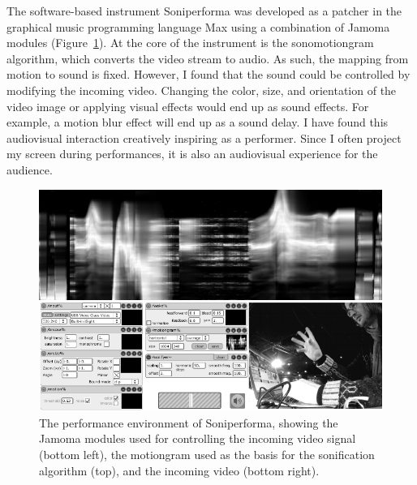 The software-based instrument Soniperforma was developed as a patcher in the graphical music programming language Max using a combination of Jamoma modules (Figure~\ref{fig:figures_soniperforma_soniperforma}). At the core of the instrument is the sonomotiongram algorithm, which converts the video stream to audio. As such, the mapping from motion to sound is fixed. However, I found that the sound could be controlled by modifying the incoming video. Changing the color, size, and orientation of the video image or applying visual effects would end up as sound effects. For example, a motion blur effect will end up as a sound delay. I have found this audiovisual interaction creatively inspiring as a performer. Since I often project my screen during performances, it is also an audiovisual experience for the audience.

\begin{figure}[tbp]
		\includegraphics[width=1\textwidth]{figures/72-soniperforma-crop.pdf}
	\caption{The performance environment of Soniperforma, showing the Jamoma modules used for controlling the incoming video signal (bottom left), the motiongram used as the basis for the sonification algorithm (top), and the incoming video (bottom right).}
	\label{fig:figures_soniperforma_soniperforma}
\end{figure}

